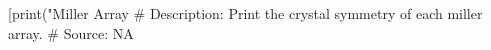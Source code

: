 [print("Miller Array %
# Description:  Print the crystal symmetry of each miller array.
# Source:  NA

